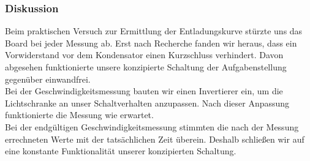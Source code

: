 \subsubsection{Diskussion}

Beim praktischen Versuch zur Ermittlung der Entladungskurve stürzte uns das Board bei jeder Messung ab. Erst nach Recherche fanden wir heraus, dass ein Vorwiderstand vor dem Kondensator einen Kurzschluss verhindert. Davon abgesehen funktionierte unsere konzipierte Schaltung der Aufgabenstellung gegenüber einwandfrei.
\\
Bei der Geschwindigkeitsmessung bauten wir einen Invertierer ein, um die Lichtschranke an unser Schaltverhalten anzupassen. Nach dieser Anpassung funktionierte die Messung wie erwartet.
\\
Bei der endgültigen Geschwindigkeitsmessung stimmten die nach der Messung errechneten Werte mit der tatsächlichen Zeit überein. Deshalb schließen wir auf eine konstante Funktionalität unserer konzipierten Schaltung.